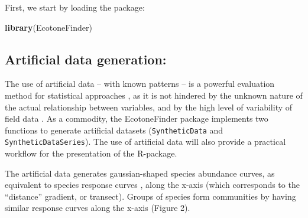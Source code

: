 \documentclass[
]{article}
\newenvironment{Shaded}{\begin{snugshade}}{\end{snugshade}}
\newcommand{\KeywordTok}[1]{\textcolor[rgb]{0.13,0.29,0.53}{\textbf{#1}}}
\newcommand{\NormalTok}[1]{#1}
\begin{document}
First, we start by loading the package:

\begin{Shaded}
\begin{Highlighting}[]
\KeywordTok{library}\NormalTok{(EcotoneFinder)}
\end{Highlighting}
\end{Shaded}

\hypertarget{artificial-data-generation}{%
\subsection{Artificial data
generation:}\label{artificial-data-generation}}

The use of artificial data -- with known patterns -- is a powerful
evaluation method for statistical approaches \autocite{Austin:2007jwa},
as it is not hindered by the unknown nature of the actual relationship
between variables, and by the high level of variability of field data
\autocite{Austin:2007jwa,Schweiger:2016gt}. As a commodity, the
EcotoneFinder package implements two functions to generate artificial
datasets (\texttt{SyntheticData} and \texttt{SyntheticDataSeries}). The
use of artificial data will also provide a practical workflow for the
presentation of the R-package.

The artificial data generates gaussian-shaped species abundance curves,
as equivalent to species response curves \autocite{Whittaker:1967wn},
along the x-axis (which corresponds to the ``distance'' gradient, or
transect). Groups of species form communities by having similar response
curves along the x-axis (Figure 2).
\end{document}
